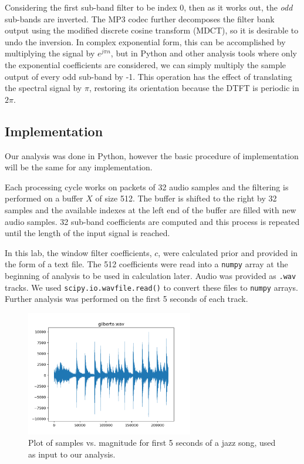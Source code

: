 \documentclass[11pt,a4paper]{article}
\begin{document}
Considering the first sub-band filter to be index 0, then as it works out, the \textit{odd} sub-bands are inverted. The MP3 codec further decomposes the filter bank output using the modified discrete cosine transform (MDCT), so it is desirable to undo the inversion. In complex exponential form, this can be accomplished by multiplying the signal by $e^{j\pi n}$, but in Python and other analysis tools where only the exponential coefficients are considered, we can simply multiply the sample output of every odd sub-band by -1. This operation has the effect of translating the spectral signal by $\pi$, restoring its orientation because the DTFT is periodic in $2\pi$.

\pagebreak

\subsection{Implementation}
Our analysis was done in Python, however the basic procedure of implementation will be the same for any implementation.

Each processing cycle works on packets of 32 audio samples and the filtering is performed on a buffer $X$ of size 512. The buffer is shifted to the right by 32 samples and the available indexes at the left end of the buffer are filled with new audio samples. 32 sub-band coefficients are computed and this process is repeated until the length of the input signal is reached.

In this lab, the window filter coefficients, $c$, were calculated prior and provided in the form of a text file. The 512 coefficients were read into a \verb|numpy| array at the beginning of analysis to be used in calculation later. Audio was provided as \verb|.wav| tracks. We used \verb|scipy.io.wavfile.read()| to convert these files to \verb|numpy| arrays. Further analysis was performed on the first 5 seconds of each track.

\begin{figure}[ht]
	\centering
	\includegraphics[width=0.65\textwidth]{gilberto}
	\caption{Plot of samples vs. magnitude for first 5 seconds of a jazz song, used as input to our analysis.}
	\label{fig:gilberto}
\end{figure}
\end{document}
